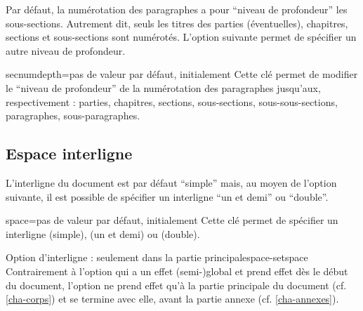 Par défaut, la numérotation des paragraphes a pour \enquote{niveau de
  profondeur} les sous-sections. Autrement dit, seuls les titres des parties
(éventuelles), chapitres, sections et sous-sections sont numérotés.  L'option
 suivante permet de spécifier un autre niveau de
profondeur.
%
{%
  \begin{docKey}{secnumdepth}{=\textbar{}\textbar{}\textbar{}\textbar{}\textbar{}\textbar{}}{pas
      de valeur par défaut, initialement }
    Cette clé permet de modifier le \enquote{niveau de profondeur} de la
    numérotation des paragraphes jusqu'aux, respectivement : parties,
    chapitres, sections, sous-sections, sous-sous-sections, paragraphes,
    sous-paragraphes.
  \end{docKey}
}

\subsection{Espace interligne}\label{sec-interligne}
%

L'interligne du document est par défaut \enquote{simple} mais, au moyen de
l'option  suivante, il est possible de spécifier un interligne
\enquote{un et demi} ou \enquote{double}.

\begin{docKey}{space}{=\textbar{}\textbar{}}{pas de valeur par défaut,
    initialement }
  Cette clé permet de spécifier un interligne  (simple),
   (un et demi) ou  (double).
\end{docKey}

\begin{dbwarning}{Option d'interligne : seulement dans la partie
    principale}{space-setspace}
  Contrairement à l'option  qui a un effet (semi-)global et
  prend effet dès le début du document, l'option  ne prend effet
  qu'à la partie principale du document (cf. \vref{cha-corps}) et se termine
  avec elle, avant la partie annexe (cf. \vref{cha-annexes}).
\end{dbwarning}

